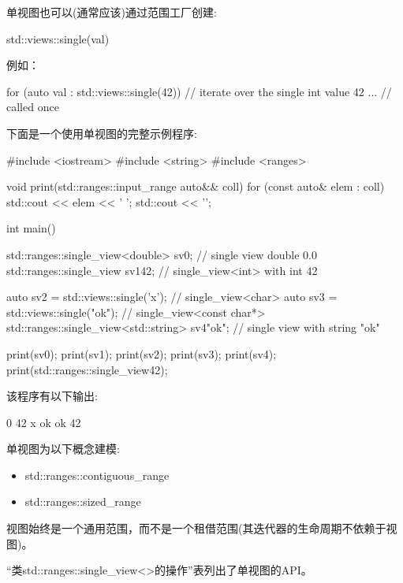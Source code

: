 单视图也可以(通常应该)通过范围工厂创建:

\begin{cpp}
std::views::single(val)
\end{cpp}

例如：

\begin{cpp}
for (auto val : std::views::single(42)) { // iterate over the single int value 42
	... // called once
}
\end{cpp}

下面是一个使用单视图的完整示例程序:


\begin{cpp}
#include <iostream>
#include <string>
#include <ranges>

void print(std::ranges::input_range auto&& coll)
{
	for (const auto& elem : coll) {
		std::cout << elem << ' ';
	}
	std::cout << '\n';
}

int main()
{
	std::ranges::single_view<double> sv0; // single view double 0.0
	std::ranges::single_view sv1{42}; // single_view<int> with int 42
	
	auto sv2 = std::views::single('x'); // single_view<char>
	auto sv3 = std::views::single("ok"); // single_view<const char*>
	std::ranges::single_view<std::string> sv4{"ok"}; // single view with string "ok"
	
	print(sv0);
	print(sv1);
	print(sv2);
	print(sv3);
	print(sv4);
	print(std::ranges::single_view{42});
}
\end{cpp}

该程序有以下输出:

\begin{shell}
0
42
x
ok
ok
42
\end{shell}


单视图为以下概念建模:

\begin{itemize}
\item
std::ranges::contiguous\_range

\item
std::ranges::sized\_range
\end{itemize}

视图始终是一个通用范围，而不是一个租借范围(其迭代器的生命周期不依赖于视图)。


“类std::ranges::single\_view<>的操作”表列出了单视图的API。

